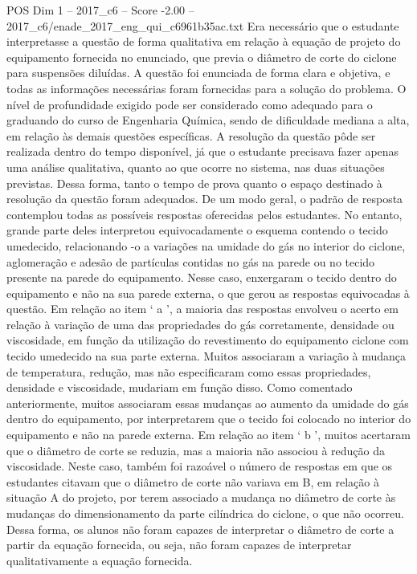 \begin{textsample}{POS Dim 1 – 2017\_c6 – Score -2.00 – 2017\_c6/enade\_2017\_eng\_qui\_c6961b35ac.txt}
Era necessário que o estudante interpretasse a questão de forma qualitativa em relação à equação de projeto do equipamento fornecida no enunciado, que previa o diâmetro de corte do ciclone para suspensões diluídas.
A questão foi enunciada de forma clara e objetiva, e todas as informações necessárias foram fornecidas para a solução do problema.
O nível de profundidade exigido pode ser considerado como adequado para o graduando do curso de Engenharia Química, sendo de dificuldade mediana a alta, em relação às demais questões específicas.
A resolução da questão pôde ser realizada dentro do tempo disponível, já que o estudante precisava fazer apenas uma análise qualitativa, quanto ao que ocorre no sistema, nas duas situações previstas.
Dessa forma, tanto o tempo de prova quanto o espaço destinado à resolução da questão foram adequados.
De um modo geral, o padrão de resposta contemplou todas as possíveis respostas oferecidas pelos estudantes.
No entanto, grande parte deles interpretou equivocadamente o esquema contendo o tecido umedecido, relacionando -o a variações na umidade do gás no interior do ciclone, aglomeração e adesão de partículas contidas no gás na parede ou no tecido presente na parede do equipamento.
Nesse caso, enxergaram o tecido dentro do equipamento e não na sua parede externa, o que gerou as respostas equivocadas à questão.
Em relação ao item ‘ a ’, a maioria das respostas envolveu o acerto em relação à variação de uma das propriedades do gás corretamente, densidade ou viscosidade, em função da utilização do revestimento do equipamento ciclone com tecido umedecido na sua parte externa.
Muitos associaram a variação à mudança de temperatura, redução, mas não especificaram como essas propriedades, densidade e viscosidade, mudariam em função disso.
Como comentado anteriormente, muitos associaram essas mudanças ao aumento da umidade do gás dentro do equipamento, por interpretarem que o tecido foi colocado no interior do equipamento e não na parede externa.
Em relação ao item ‘ b ’, muitos acertaram que o diâmetro de corte se reduzia, mas a maioria não associou à redução da viscosidade.
Neste caso, também foi razoável o número de respostas em que os estudantes citavam que o diâmetro de corte não variava em B, em relação à situação A do projeto, por terem associado a mudança no diâmetro de corte às mudanças do dimensionamento da parte cilíndrica do ciclone, o que não ocorreu.
Dessa forma, os alunos não foram capazes de interpretar o diâmetro de corte a partir da equação fornecida, ou seja, não foram capazes de interpretar qualitativamente a equação fornecida.

\end{textsample}
